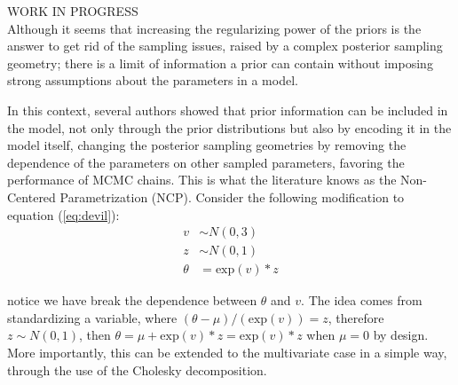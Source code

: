 {\color{red} WORK IN PROGRESS \\
	
Although it seems that increasing the regularizing power of the priors is the answer to get rid of the sampling issues, raised by a complex posterior sampling geometry; there is a limit of information a prior can contain without imposing strong assumptions about the parameters in a model.

In this context, several authors \cite{Gelfand_et_al_1995, Gelfand_et_al_1996, Papaspiliopoulos_et_al_2003, Papaspiliopoulos_et_al_2007, Betancourt_et_al_2013} showed that prior information can be included in the model, not only through the prior distributions but also by encoding it in the model itself, changing the posterior sampling geometries by removing the dependence of the parameters on other sampled parameters, favoring the performance of MCMC chains. This is what the literature knows as the Non-Centered Parametrization (NCP). Consider the following modification to equation (\ref{eq:devil}):
%
\begin{equation} \label{eq:devil_prior}
	\begin{split}	
		v &\sim N(0, 3) \\
		z &\sim N(0, 1) \\
		\theta &= \text{exp}(v) * z
	\end{split}
\end{equation}

\noindent notice we have break the dependence between $\theta$ and $v$. The idea comes from standardizing a variable, where $(\theta - \mu)/( \text{exp}(v) ) = z$, therefore $z \sim N(0,1)$, then $\theta = \mu + \text{exp}(v) * z = \text{exp}(v) * z$ when $\mu=0$ by design. More importantly, this can be extended to the multivariate case in a simple way, through the use of the Cholesky decomposition.

}
